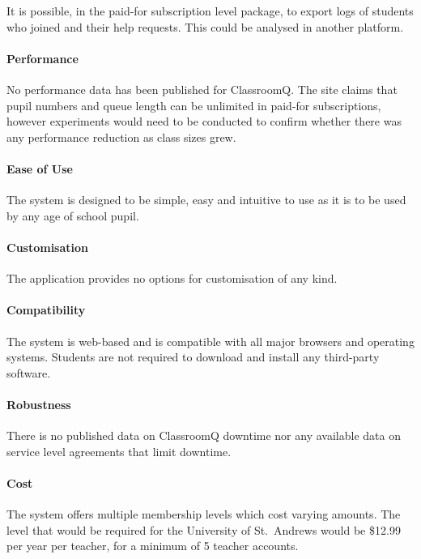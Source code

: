 It is possible, in the paid-for subscription level package, to export logs of students who joined and their help requests. This could be analysed in another platform.


\paragraph{Performance}  
No performance data has been published for ClassroomQ. The site claims that pupil numbers and queue length can be unlimited in paid-for subscriptions, however experiments would need to be conducted to confirm whether there was any performance reduction as class sizes grew.

\paragraph{Ease of Use}
The system is designed to be simple, easy and intuitive to use as it is to be used by any age of school pupil. 

\paragraph{Customisation} 
The application provides no options for customisation of any kind.


\paragraph{Compatibility}  

The system is web-based and is compatible with all major browsers and operating systems. Students are not required to download and install any third-party software. 

\paragraph{Robustness}

There is no published data on ClassroomQ downtime nor any available data on service level agreements that limit downtime.

\paragraph{Cost}  
The system offers multiple membership levels which cost varying amounts. The level that would be required for the University of St.\ Andrews would be \$12.99 per year per teacher, for a minimum of 5 teacher accounts.

